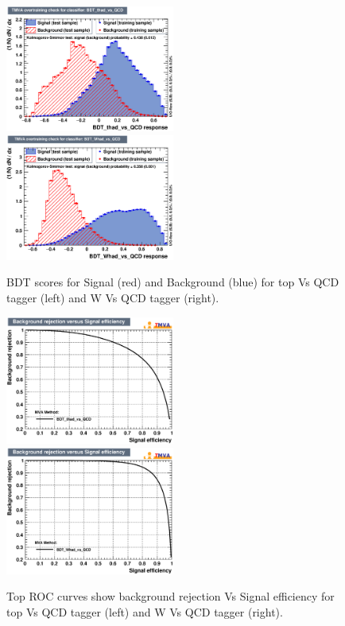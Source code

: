 \documentclass{cernrep}
\begin{document}
\begin{figure}[!htb]\centering
\includegraphics[width=0.495\textwidth]{Fig/TMVA/thad_vs_QCD/overtrain_BDT_thad_vs_QCD.eps}
\includegraphics[width=0.495\textwidth]{Fig/TMVA/Whad_vs_QCD/overtrain_BDT_Whad_vs_QCD.eps}
\caption{BDT scores for Signal (red) and Background (blue) for top Vs QCD tagger (left) and W Vs QCD tagger (right).}
\label{fig:TMVA_BDTscore}
\end{figure}

\begin{figure}[!htb]\centering
\includegraphics[width=0.495\textwidth]{Fig/TMVA/thad_vs_QCD/rejBvsS.eps}
\includegraphics[width=0.495\textwidth]{Fig/TMVA/Whad_vs_QCD/rejBvsS.eps}
\caption{Top ROC curves show background rejection Vs Signal efficiency for top Vs QCD tagger (left) and W Vs QCD tagger (right).}
\label{fig:TMVA_ROC}
\end{figure}
\end{document}

